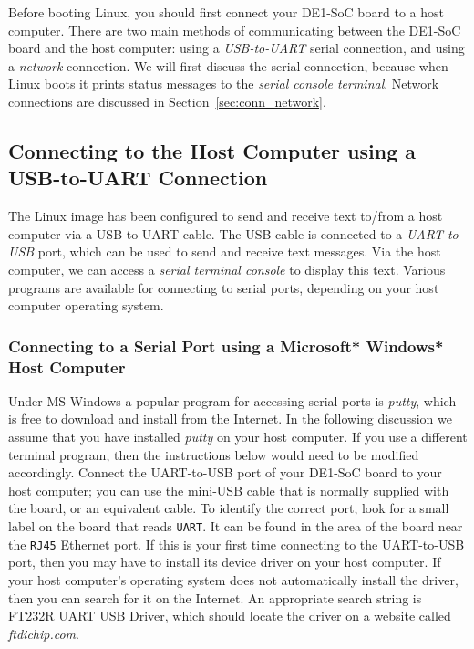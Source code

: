 \documentclass[11pt, twoside, pdftex]{article}
\begin{document}
Before booting Linux, you should first connect your DE1-SoC board to a host computer.
There are two main methods of communicating between the DE1-SoC board and the host
computer: using a {\it USB-to-UART} serial connection, and using a {\it network} connection.
We will first discuss the serial connection, because when Linux boots it prints status
messages to the {\it serial console terminal}. Network connections are discussed in 
Section~\ref{sec:conn_network}.

\subsection{Connecting to the Host Computer using a USB-to-UART Connection}
\label{sec:conn_USB}

The Linux image has been configured to send and receive text to/from a host computer via a 
USB-to-UART cable. The USB cable is connected to a {\it UART-to-USB} port, which can be used to 
send and receive text messages. Via the host computer, we can access a \textit{serial terminal
console} to display this text. Various programs are available for connecting to serial
ports, depending on your host computer operating system.

\subsubsection{Connecting to a Serial Port using a Microsoft* Windows* Host Computer}

Under MS Windows a popular program for accessing serial ports is {\it putty}, which is
free to download and install from the Internet. 
In the following discussion we assume that you have installed {\it putty} on your host computer.
If you use a different terminal program, then the instructions below
would need to be modified accordingly. Connect the UART-to-USB port of your DE1-SoC board 
to your host computer; you can use the mini-USB cable that is normally supplied with the 
board, or an equivalent cable. To identify the
correct port, look for a small label on the board that reads \texttt{UART}. It can be found 
in the area of the board near the \texttt{RJ45} Ethernet port. If this is your first 
time connecting to the UART-to-USB port, then you may have to install its device driver 
on your host computer. If your host computer's operating system does not automatically 
install the driver, then you can search for it on the Internet. An appropriate search 
string is {\sf FT232R UART USB 
Driver}, which should locate the driver on a website called {\it ftdichip.com}.
\end{document}
